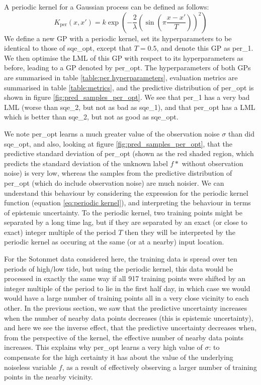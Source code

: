 A periodic kernel for a Gaussian process can be defined as follows:
\begin{equation}
    K_\mathrm{per}(x, x') = k \exp\left( -\frac{2}{\lambda} \left( \sin \left( \pi \frac{x-x'}{T} \right) \right)^2 \right) \label{eq:periodic kernel}
\end{equation}
We define a new GP with a periodic kernel, set its hyperparameters to be identical to those of sqe\_opt, except that $T=0.5$, and denote this GP as per\_1. We then optimise the LML of this GP with respect to its hyperparameters as before, leading to a GP denoted by per\_opt. The hyperparameters of both GPs are summarised in table \ref{table:per hyperparameters}, evaluation metrics are summarised in table \ref{table:metrics}, and the predictive distribution of per\_opt is shown in figure \ref{fig:pred_samples_per_opt}. We see that per\_1 has a very bad LML (worse than sqe\_2, but not as bad as sqe\_1), and that per\_opt has a LML which is better than sqe\_2, but not as good as sqe\_opt.

We note per\_opt learns a much greater value of the observation noise $\sigma$ than did sqe\_opt, and also, looking at figure \ref{fig:pred_samples_per_opt}, that the predictive standard deviation of per\_opt (shown as the red shaded region, which predicts the standard deviation of the unknown label $f*$ without observation noise) is very low, whereas the samples from the predictive distribution of per\_opt (which do include observation noise) are much noisier. We can understand this behaviour by considering the expression for the periodic kernel function (equation \ref{eq:periodic kernel}), and interpreting the behaviour in terms of epistemic uncertainty. To the periodic kernel, two training points might be separated by a long time lag, but if they are separated by an exact (or close to exact) integer multiple of the period $T$ then they will be interpreted by the periodic kernel as occuring at the same (or at a nearby) input location.

For the Sotonmet data considered here, the training data is spread over ten periods of high/low tide, but using the periodic kernel, this data would be processed in exactly the same way if all 917 training points were shifted by an integer multiple of the period to lie in the first half day, in which case we would would have a large number of training points all in a very close vicinity to each other. In the previous section, we saw that the predictive uncertainty increases when the number of nearby data points decreases (this is epistemic uncertainty), and here we see the inverse effect, that the predictive uncertainty decreases when, from the perspective of the kernel, the effective number of nearby data points increases. This explains why per\_opt learns a very high value of $\sigma$: to compensate for the high certainty it has about the value of the underlying noiseless variable $f$, as a result of effectively observing a larger number of training points in the nearby vicinity.


